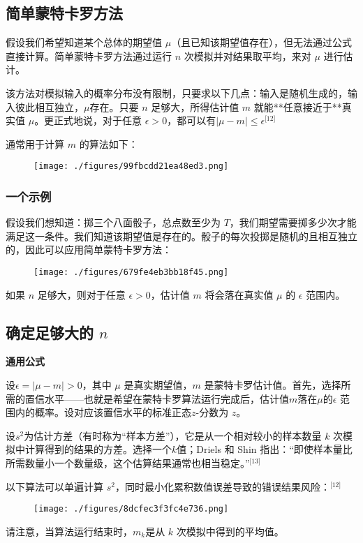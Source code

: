 \subsection{简单蒙特卡罗方法}
假设我们希望知道某个总体的期望值 $\mu$（且已知该期望值存在），但无法通过公式直接计算。简单蒙特卡罗方法通过运行 $n$ 次模拟并对结果取平均，来对 $\mu$ 进行估计。

该方法对模拟输入的概率分布没有限制，只要求以下几点：输入是随机生成的，输入彼此相互独立，$\mu$存在。只要 $n$ 足够大，所得估计值 $m$ 就能**任意接近于**真实值 $\mu$。更正式地说，对于任意 $\epsilon > 0$，都可以有$|\mu - m| \leq \epsilon$\(^\text{[12]}\)

通常用于计算 $m$ 的算法如下：
\begin{figure}[ht]
\centering
\texttt{[image: ./figures/99fbcdd21ea48ed3.png]}
\caption{} \label{fig_MTKL_2}
\end{figure}
\subsubsection{一个示例}
假设我们想知道：掷三个八面骰子，总点数至少为 $T$，我们期望需要掷多少次才能满足这一条件。我们知道该期望值是存在的。骰子的每次投掷是随机的且相互独立的，因此可以应用简单蒙特卡罗方法：
\begin{figure}[ht]
\centering
\texttt{[image: ./figures/679fe4eb3bb18f45.png]}
\caption{} \label{fig_MTKL_3}
\end{figure}
如果 $n$ 足够大，则对于任意 $\epsilon > 0$，估计值 $m$ 将会落在真实值 $\mu$ 的 $\epsilon$ 范围内。
\subsection{确定足够大的 $n$}

\textbf{通用公式}

设$\epsilon = |\mu - m| > 0$，其中 $\mu$ 是真实期望值，$m$ 是蒙特卡罗估计值。首先，选择所需的置信水平——也就是希望在蒙特卡罗算法运行完成后，估计值$m$落在$\mu$的$\epsilon$ 范围内的概率。设对应该置信水平的标准正态$z$-分数为 $z$。

设$s^2$为估计方差（有时称为“样本方差”），它是从一个相对较小的样本数量 $k$ 次模拟中计算得到的结果的方差。选择一个$k$值；Driels 和 Shin 指出：“即使样本量比所需数量小一个数量级，这个估算结果通常也相当稳定。”\(^\text{[13]}\)

以下算法可以单遍计算 $s^2$，同时最小化累积数值误差导致的错误结果风险：\(^\text{[12]}\)
\begin{figure}[ht]
\centering
\texttt{[image: ./figures/8dcfec3f3fc4e736.png]}
\caption{} \label{fig_MTKL_4}
\end{figure}
请注意，当算法运行结束时，$m_k$是从 $k$ 次模拟中得到的平均值。


